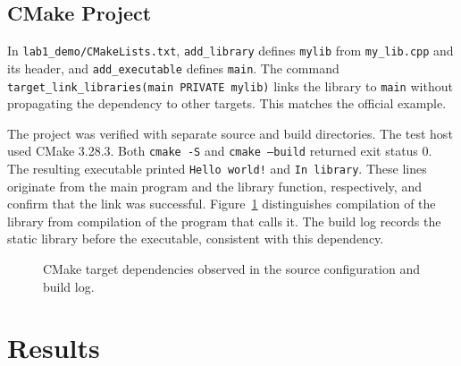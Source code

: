 \documentclass[letterpaper,10pt,conference]{ieeeconf}
\begin{document}
\subsection{CMake Project}

In \texttt{lab1\_demo/CMakeLists.txt}, \texttt{add\_library} defines \texttt{mylib} from \texttt{my\_lib.cpp} and its header, and \texttt{add\_executable} defines \texttt{main}. The command \texttt{target\_link\_libraries(main PRIVATE mylib)} links the library to \texttt{main} without propagating the dependency to other targets. This matches the official example\cite{vnavcmake}.

The project was verified with separate source and build directories. The test host used CMake 3.28.3. Both \texttt{cmake -S} and \texttt{cmake --build} returned exit status 0. The resulting executable printed \texttt{Hello world!} and \texttt{In library}. These lines originate from the main program and the library function, respectively, and confirm that the link was successful. Figure~\ref{fig:cmake} distinguishes compilation of the library from compilation of the program that calls it. The build log records the static library before the executable, consistent with this dependency.

\begin{figure}[t]
\centering
{}
\caption{CMake target dependencies observed in the source configuration and build log.}
\label{fig:cmake}
\end{figure}

\section{Results}
\end{document}
